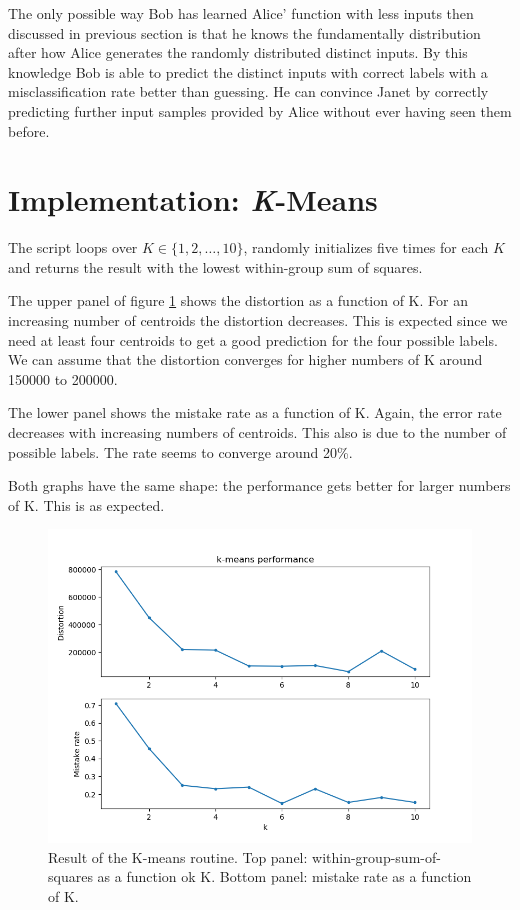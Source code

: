 \documentclass[12pt]{article}
\begin{document}
The only possible way Bob has learned Alice' function with less inputs then discussed in previous section is that he knows the fundamentally distribution after how Alice generates the randomly distributed distinct inputs. By this knowledge Bob is able to predict the distinct inputs with correct labels with a misclassification rate better than guessing. He can convince Janet by correctly predicting further input samples provided by Alice without ever having seen them before.

\section{Implementation: \textit{K}-Means}
The script loops over $K \in \{1,2,\dots,10\}$, randomly initializes five times for each $K$ and returns the result with the lowest within-group sum of squares. \par 
The upper panel of figure \ref{fig:Kmeans} shows the distortion as a function of K. For an increasing number of centroids the distortion decreases. This is expected since we need at least four centroids to get a good prediction for the four possible labels. We can assume that the distortion converges for higher numbers of K around 150000 to 200000.\par 
The lower panel shows the mistake rate as a function of K. Again, the error rate decreases with increasing numbers of centroids. This also is due to the number of possible labels. The rate seems to converge around 20\%. \par 
Both graphs have the same shape: the performance gets better for larger numbers of K. This is as expected. 
\begin{figure}[h!]
	\centering
	\includegraphics[width=0.8\linewidth]{../Problem_4/Run_5.png}
	\caption{Result of the K-means routine. Top panel: within-group-sum-of-squares as a function ok K. Bottom panel: mistake rate as a function of K. }
	\label{fig:Kmeans}
\end{figure}




%
%
\end{document}
